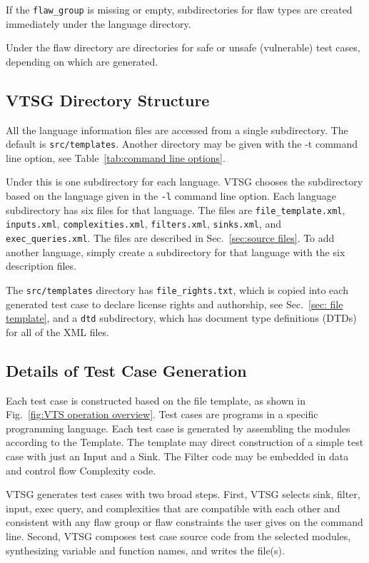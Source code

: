 \documentclass[12pt]{article}
\begin{document}
If the \verb|flaw_group| is missing or empty, subdirectories for flaw types are
created immediately under the language directory.

Under the flaw directory are directories for safe or unsafe
(vulnerable) test cases, depending on
which are generated.

\subsection{VTSG Directory Structure}
\label{sec: directory structure}

All the language information files are accessed from a single subdirectory.  The
default is \verb|src/templates|.  Another directory may be given with the -t command
line option, see Table~\ref{tab:command line options}.

Under this is one subdirectory for each language.  VTSG chooses the
subdirectory based on the language given in the \verb|-l| command line
option.  Each language subdirectory has six files for that language.
The files are \verb|file_template.xml|, \verb|inputs.xml|,
\verb|complexities.xml|, \verb|filters.xml|, \verb|sinks.xml|,
and \verb|exec_queries.xml|.
The files are described in Sec.~\ref{sec:source files}.
To add another language,
simply create a subdirectory for that language with the six description
files.

The \verb|src/templates| directory has \verb|file_rights.txt|, which is
copied into each generated test case to declare license rights and
authorship, see Sec.~\ref{sec: file template}, and a 
\verb|dtd| subdirectory, which has document type definitions (DTDs)
for all of the XML files.


\subsection{Details of Test Case Generation}
\label{sec: generation detail}

Each test case is constructed based on the file template, as shown
in Fig.~\ref{fig:VTS operation overview}. Test cases are 
programs in a specific programming language.
Each test case is generated by
assembling the modules according to the Template.  The
template may direct construction of a simple test case with just
an Input and a Sink.
The Filter code may be embedded in data and control flow
Complexity code.

VTSG generates test cases with two broad steps.  First, VTSG selects
sink, filter, input, exec query, and complexities that are
compatible with each other and consistent with any flaw group or
flaw constraints the user gives on the command line.  Second, VTSG
composes test case source code from the selected modules, 
synthesizing variable and function names, and writes the file(s).
\end{document}
